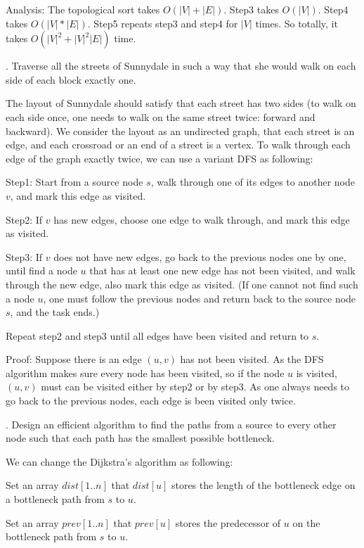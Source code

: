 \documentclass[11pt]{article}
\begin{document}
\noindent
Analysis: The topological sort takes $O(|V|+|E|)$. Step3 takes $O(|V|)$. Step4 takes $O(|V|*|E|)$. Step5 repeats step3 and step4 for $|V|$ times. So totally, it takes $O(|V|^2 + |V|^2|E|)$ time.


. Traverse all the streets of Sunnydale in such a way that she would walk on each side of each block exactly one.

\noindent
The layout of Sunnydale should satisfy that each street has two sides (to walk on each side once, one needs to walk on the same street twice: forward and backward). We consider the layout as an undirected graph, that each street is an edge, and each crossroad or an end of a street is a vertex. To walk through each edge of the graph exactly twice, we can use a variant DFS as following:

\noindent
Step1: Start from a source node $s$, walk through one of its edges to another node $v$, and mark this edge as visited. 

\noindent
Step2: If $v$ has new edges, choose one edge to walk through, and mark this edge as visited. 

\noindent
Step3: If $v$ does not have new edges, go back to the previous nodes one by one, until find a node $u$ that has at least one new edge has not been visited, and walk through the new edge, also mark this edge as visited. (If one cannot not find such a node $u$, one must follow the previous nodes and return back to the source node $s$, and the task ends.)

\noindent
Repeat step2 and step3 until all edges have been visited and return to $s$.

\noindent
Proof: Suppose there is an edge $(u, v)$ has not been visited. As the DFS algorithm makes sure every node has been visited, so if the node $u$ is visited, $(u, v)$ must can be visited either by step2 or by step3. As one always needs to go back to the previous nodes, each edge is been visited only twice. 


. Design an efficient algorithm to find the paths from a source to every other node such that each path has the smallest possible bottleneck.

\noindent
We can change the Dijkstra's algorithm as following:

\noindent
Set an array $dist[1..n]$ that $dist[u]$ stores the length of the bottleneck edge on a bottleneck path from $s$ to $u$.

\noindent
Set an array $prev[1..n]$ that $prev[u]$ stores the predecessor of $u$ on the bottleneck path from $s$ to $u$.
\end{document}
